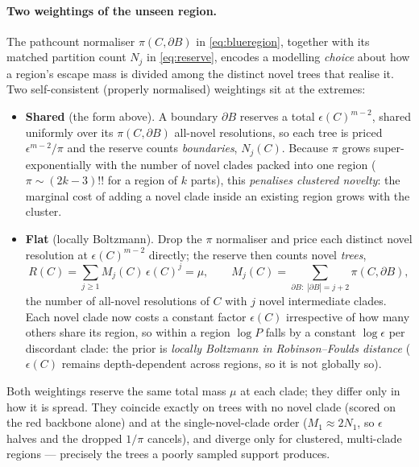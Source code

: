 \documentclass{article}
\begin{document}
\paragraph{Two weightings of the unseen region.}
The pathcount normaliser $\pi(C,\partial B)$ in \eqref{eq:blueregion}, together with
its matched partition count $N_j$ in \eqref{eq:reserve}, encodes a modelling
\emph{choice} about how a region's escape mass is divided among the distinct novel
trees that realise it. Two self-consistent (properly normalised) weightings sit at
the extremes:
\begin{itemize}
  \item \textbf{Shared} (the form above). A boundary $\partial B$ reserves a total
  $\epsilon(C)^{m-2}$, shared uniformly over its $\pi(C,\partial B)$ all-novel
  resolutions, so each tree is priced $\epsilon^{m-2}/\pi$ and the reserve counts
  \emph{boundaries}, $N_j(C)$. Because $\pi$ grows super-exponentially with the
  number of novel clades packed into one region ($\pi\sim(2k{-}3)!!$ for a region of
  $k$ parts), this \emph{penalises clustered novelty}: the marginal cost of adding a
  novel clade inside an existing region grows with the cluster.
  \item \textbf{Flat} (locally Boltzmann). Drop the $\pi$ normaliser and price each
  distinct novel resolution at $\epsilon(C)^{m-2}$ directly; the reserve then counts
  novel \emph{trees},
  \begin{equation}
    R(C)=\sum_{j\ge1} M_j(C)\,\epsilon(C)^j=\mu,
    \qquad
    M_j(C)=\!\!\sum_{\partial B:\;|\partial B|=j+2}\!\!\pi(C,\partial B),
    \label{eq:flatreserve}
  \end{equation}
  the number of all-novel resolutions of $C$ with $j$ novel intermediate clades.
  Each novel clade now costs a constant factor $\epsilon(C)$ irrespective of how many
  others share its region, so within a region $\log P$ falls by a constant
  $\log\epsilon$ per discordant clade: the prior is \emph{locally Boltzmann in
  Robinson--Foulds distance} ($\epsilon(C)$ remains depth-dependent across regions,
  so it is not globally so).
\end{itemize}
Both weightings reserve the same total mass $\mu$ at each clade; they differ only in
how it is spread. They coincide exactly on trees with no novel clade (scored on the
red backbone alone) and at the single-novel-clade order ($M_1\approx 2N_1$, so
$\epsilon$ halves and the dropped $1/\pi$ cancels), and diverge only for clustered,
multi-clade regions --- precisely the trees a poorly sampled support produces.
\end{document}
